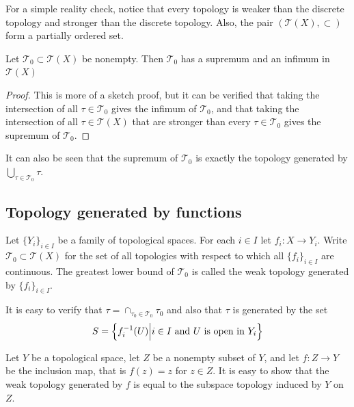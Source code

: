 \documentclass[11pt,a4paper]{article}
\begin{document}
\begin{remark}
  For a simple reality check, notice that every topology is weaker than the
  discrete topology and stronger than the discrete topology. Also, the
  pair $(\mathcal{T}(X), \subset)$ form a partially ordered set.
\end{remark}

\begin{proposition}
  Let $\mathcal T_0 \subset \mathcal T(X)$ be nonempty. Then $\mathcal T_0$
  has a supremum and an infimum in $\mathcal T(X)$
\end{proposition}
\begin{proof}
  This is more of a sketch proof, but it can be verified that taking the
  intersection of all $\tau \in \mathcal T_0$ gives the infimum of 
  $\mathcal T_0$, and that taking the intersection of all 
  $\tau \in \mathcal T(X)$ that are stronger than every 
  $\tau \in \mathcal T_0$ gives the supremum of $\mathcal T_0$.
\end{proof}

\begin{remark}
  It can also be seen that the supremum of $\mathcal T_0$ is exactly the
  topology generated by $\bigcup_{\tau \in \mathcal T_0} \tau$.
\end{remark}

\subsection{Topology generated by functions}

\begin{definition}
  Let $\{Y_i\}_{i \in I}$ be a family of topological spaces. For each
  $i \in I$ let $f_i \colon X \to Y_i$. Write $\mathcal{T}_0 \subset 
  \mathcal{T}(X)$ for the set of all topologies with respect to which all
  $\{f_i\}_{i \in I}$ are continuous. The greatest lower bound of 
  $\mathcal{T}_0$ is called the weak topology generated by 
  $\{f_i\}_{i \in I}$.
\end{definition}

\begin{remark}
It is easy to verify that $\tau = \cap_{\tau_0 \in \mathcal{T}_0}{\tau_0}$
and also that $\tau$ is generated by the set
\[
  S = \left\{f_i^{-1}(U) \middle\vert i \in I \text{ and $U$ is open in $Y_i$}\right\}
\]
\end{remark}

\begin{example}
  Let $Y$ be a topological space, let $Z$ be a nonempty subset of $Y$,
  and let $f \colon Z \to Y$ be the inclusion map, that is $f(z) = z$ 
  for $z \in Z$. It is easy to show that the weak topology generated by $f$ 
  is equal to the subspace topology induced by $Y$ on $Z$.
\end{example}
\end{document}
